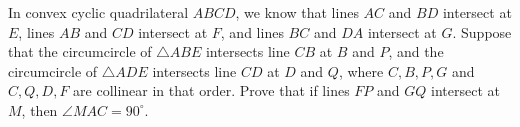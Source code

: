 In convex cyclic quadrilateral $ABCD$,  we know that lines $AC$ and $BD$ intersect at $E$,  lines $AB$ and $CD$ intersect at $F$,  and lines $BC$ and $DA$ intersect at $G$. Suppose that the circumcircle of $\triangle ABE$ intersects line $CB$ at $B$ and $P$,  and the circumcircle of $\triangle ADE$ intersects line $CD$ at $D$ and $Q$,  where $C,B,P,G$ and $C,Q,D,F$ are collinear in that order. Prove that if lines $FP$ and $GQ$ intersect at $M$,  then $\angle MAC = 90^\circ$.